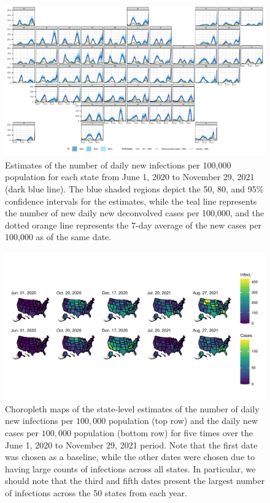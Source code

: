 \documentclass{article}
\begin{document}
\begin{figure}[!tb]
    \centering
        \includegraphics[width=.99\linewidth]{state_niauc_est_faceted_F24.pdf} 
        \caption{Estimates of the number of daily new infections per 100,000
            population for each \US state from June 1, 2020 to November 29, 2021
            (dark blue line). The blue shaded regions depict the 50, 80, and 95\%
            confidence intervals for the estimates, while the teal line represents
            the number of new daily new deconvolved cases per 100,000, and the
            dotted orange line represents the 7-day average of the new cases per
            100,000 as of the same date.}
        \label{fig:state_infect_est}
    \end{figure}
    

\begin{figure}[!tb]
\centering
    \includegraphics[width=.99\textwidth]{choro_inf_case_rates_F24.pdf}
    \caption{Choropleth maps of the state-level estimates of the number of daily
    new infections per $100,000$ population (top row) and the daily new cases
    per $100,000$ population (bottom row) for five times over the June 1, 2020
    to November 29, 2021 period. Note that the first date was chosen as a baseline,
    while the other dates were chosen due to having large counts of infections
    across all states. In particular, we should note that the third and fifth dates present
     the largest number of infections across the 50 states from each year.} 
    \label{fig:choro_inf_case_rates}
\end{figure}    
\end{document}
